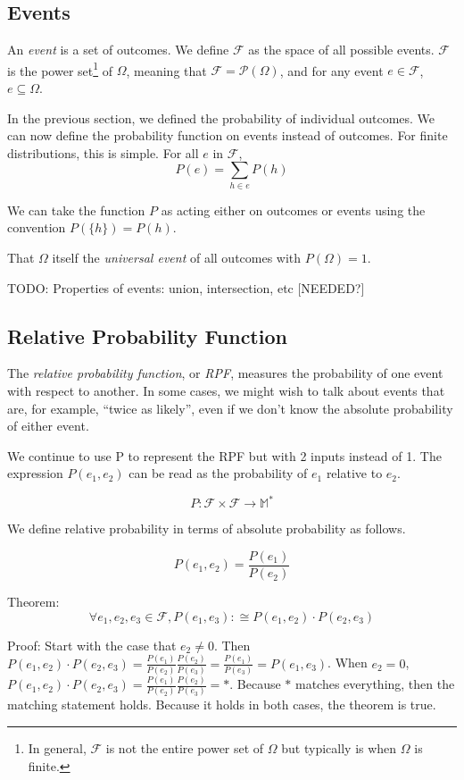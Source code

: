 \documentclass[twoside]{article}
\newcommand{\quotes}[1]{``#1''}
\begin{document}
\subsection{Events}

An \textit{event} is a set of outcomes. We define \(\mathcal{F}\) as the space of all possible events. \(\mathcal{F}\) is the power set\footnote{In general, \(\mathcal{F}\) is not the entire power set of \(\Omega\) but typically is when \(\Omega\) is finite.} of \(\Omega\), meaning that \(\mathcal{F} = \mathcal{P}(\Omega)\), and for any event \(e \in \mathcal{F}\), \(e \subseteq \Omega\).

In the previous section, we defined the probability of individual outcomes. We can now define the probability function on events instead of outcomes. For finite distributions, this is simple. For all \(e\) in \(\mathcal{F}\),
\[ P(e) = \sum_{h \in e}{P({h})}\]

We can take the function \(P\) as acting either on outcomes or events using the convention \(P(\{h\}) = P(h)\). 

That \(\Omega\) itself the \textit{universal event} of all outcomes with \(P(\Omega) = 1\).

TODO: Properties of events: union, intersection, etc [NEEDED?]

\subsection{Relative Probability Function}

The \textit{relative probability function}, or \textit{RPF}, measures the probability of one event with respect to another. In some cases, we might wish to talk about events that are, for example, \quotes{twice as likely}, even if we don't know the absolute probability of either event.

We continue to use P to represent the RPF but with 2 inputs instead of 1. The expression \(P(e_1, e_2)\) can be read as the probability of \(e_1\) relative to \(e_2\).

\[P: \mathcal{F} \times \mathcal{F} \rightarrow \mathbb{M}^*\]

We define relative probability in terms of absolute probability as follows.

\[P(e_1, e_2) = \frac{P(e_1)}{P(e_2)}\]

Theorem: \[\forall e_1, e_2, e_3 \in \mathcal{F}, P(e_1, e_3) :\cong P(e_1, e_2) \cdot P(e_2, e_3)\]

Proof: Start with the case that \(e_2 \neq 0\). Then \(P(e_1, e_2) \cdot P(e_2, e_3) = \frac{P(e_1)}{P(e_2)}\frac{P(e_2)}{P(e_3)} = \frac{P(e_1)}{P(e_3)} = P(e_1, e_3)\). When \(e_2 = 0\), \(P(e_1, e_2) \cdot P(e_2, e_3) = \frac{P(e_1)}{P(e_2)}\frac{P(e_2)}{P(e_3)} = \ast\). Because \(\ast\) matches everything, then the matching statement holds. Because it holds in both cases, the theorem is true.
\end{document}
